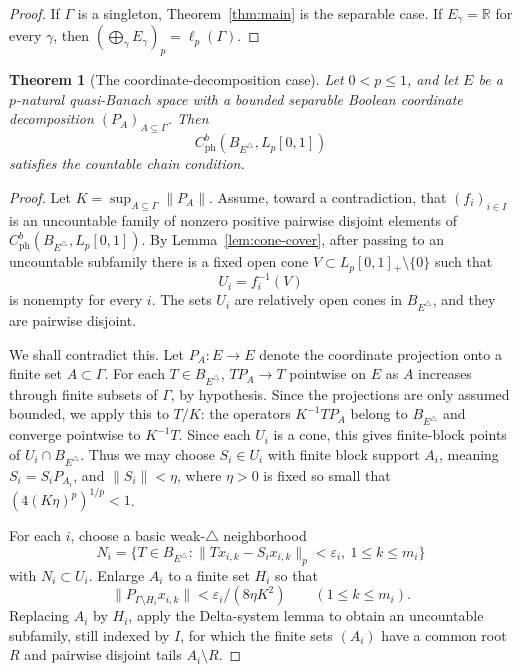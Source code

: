 \documentclass[11pt]{article}
\newtheorem{theorem}{Theorem}
\newcommand{\Lp}{L_p[0,1]}
\newcommand{\ph}{\mathrm{ph}}
\begin{document}
\begin{proof}
If \(\Gamma\) is a singleton, Theorem~\ref{thm:main} is the separable case.
If \(E_\gamma=\mathbb R\) for every \(\gamma\), then
\((\bigoplus_\gamma E_\gamma)_p=\ell_p(\Gamma)\).
\end{proof}

\begin{theorem}[The coordinate-decomposition case]
\label{thm:coordinate-decomposition}
Let \(0<p\leq1\), and let \(E\) be a \(p\)-natural quasi-Banach space with a
bounded separable Boolean coordinate decomposition
\((P_A)_{A\subseteq\Gamma}\).  Then
\[
  C_{\ph}^b(B_{E^\triangle},\Lp)
\]
satisfies the countable chain condition.
\end{theorem}

\begin{proof}
Let \(K=\sup_{A\subseteq\Gamma}\|P_A\|\).
Assume, toward a contradiction, that \((f_i)_{i\in I}\) is an uncountable
family of nonzero positive pairwise disjoint elements of
\(C_{\ph}^b(B_{E^\triangle},\Lp)\).  By Lemma~\ref{lem:cone-cover}, after
passing to an uncountable subfamily there is a fixed open cone
\(V\subset\Lp{}_+\setminus\{0\}\) such that
\[
  U_i=f_i^{-1}(V)
\]
is nonempty for every \(i\).  The sets \(U_i\) are relatively open cones in
\(B_{E^\triangle}\), and they are pairwise disjoint.

We shall contradict this.  Let \(P_A:E\to E\) denote the coordinate projection
onto a finite set \(A\subset\Gamma\).  For each \(T\in B_{E^\triangle}\),
\(TP_A\to T\) pointwise on \(E\) as \(A\) increases through finite subsets of
\(\Gamma\), by hypothesis.  Since the projections are only assumed bounded,
we apply this to \(T/K\): the operators \(K^{-1}TP_A\) belong to
\(B_{E^\triangle}\) and converge pointwise to \(K^{-1}T\).  Since each \(U_i\)
is a cone, this gives finite-block points of \(U_i\cap B_{E^\triangle}\).
Thus we may choose \(S_i\in U_i\) with finite block support \(A_i\), meaning
\(S_i=S_iP_{A_i}\), and \(\|S_i\|<\eta\), where \(\eta>0\) is fixed so small
that
\((4(K\eta)^p)^{1/p}<1\).

For each \(i\), choose a basic weak-\(\triangle\) neighborhood
\[
  N_i=\{T\in B_{E^\triangle}:\|T x_{i,k}-S_i x_{i,k}\|_p<\varepsilon_i,
        \ 1\leq k\leq m_i\}
\]
with \(N_i\subset U_i\).  Enlarge \(A_i\) to a finite set \(H_i\) so that
\[
  \|P_{\Gamma\setminus H_i}x_{i,k}\|<\varepsilon_i/(8\eta K^2)
  \qquad (1\leq k\leq m_i).
\]
Replacing \(A_i\) by \(H_i\), apply the Delta-system lemma to obtain an
uncountable subfamily, still indexed by \(I\), for which the finite sets
\((A_i)\) have a common root \(R\) and pairwise disjoint tails
\(A_i\setminus R\).


\end{proof}
\end{document}
